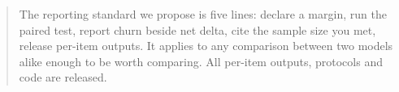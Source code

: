 \begin{abstract}
{\sloppy
The reporting standard we propose is five lines: declare a margin, run the
paired test, report churn beside net delta, cite the sample size you met,
release per-item outputs. It applies to any comparison between two models alike
enough to be worth comparing. All per-item outputs, protocols and code are
released.\par}
\end{abstract}

%
%
%
%
%
